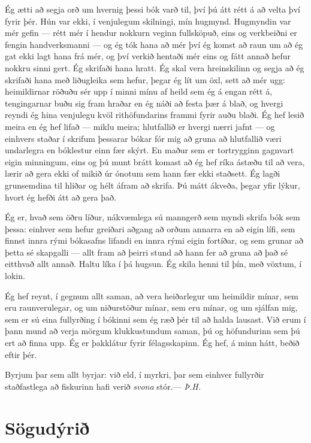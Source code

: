 Ég ætti að segja orð um hvernig þessi bók varð til, því þú átt rétt á að velta því fyrir þér. Hún var ekki, í venjulegum skilningi, mín hugmynd. Hugmyndin var mér gefin — rétt mér í hendur nokkurn veginn fullsköpuð, eins og verkbeiðni er fengin handverksmanni — og ég tók hana að mér því ég komst að raun um að ég gat ekki lagt hana frá mér, og því verkið hentaði mér eins og fátt annað hefur nokkru sinni gert. Ég skrifaði hana hratt. Ég skal vera hreinskilinn og segja að ég skrifaði hana með liðugleika sem hefur, þegar ég lít um öxl, sett að mér ugg: heimildirnar röðuðu sér upp í minni mínu af heild sem ég á engan rétt á, tengingarnar buðu sig fram hraðar en ég náði að festa þær á blað, og hvergi reyndi ég hina venjulegu kvöl rithöfundarins frammi fyrir auðu blaði. Ég hef lesið meira en ég hef lifað — miklu meira; hlutfallið er hvergi nærri jafnt — og einhvers staðar í skrifum þessarar bókar fór mig að gruna að hlutfallið væri undarlegra en bóklestur einn fær skýrt. En maður sem er tortrygginn gagnvart eigin minningum, eins og þú munt brátt komast að ég hef ríka ástæðu til að vera, lærir að gera ekki of mikið úr ónotum sem hann fær ekki staðsett. Ég lagði grunsemdina til hliðar og hélt áfram að skrifa. Þú mátt ákveða, þegar yfir lýkur, hvort ég hefði átt að gera það.

Ég er, hvað sem öðru líður, nákvæmlega sú manngerð sem myndi skrifa bók sem þessa: einhver sem hefur greiðari aðgang að orðum annarra en að eigin lífi, sem finnst innra rými bókasafns lifandi en innra rými eigin fortíðar, og sem grunar að þetta sé skapgalli — allt fram að þeirri stund að hann fer að gruna að það sé eitthvað allt annað. Haltu líka í þá hugsun. Ég skila henni til þín, með vöxtum, í lokin.

Ég hef reynt, í gegnum allt saman, að vera heiðarlegur um heimildir mínar, sem eru raunverulegar, og um niðurstöður mínar, sem eru mínar, og um sjálfan mig, sem er sú eina fullyrðing í bókinni sem ég ræð þér til að halda lausast. Við erum í þann mund að verja mörgum klukkustundum saman, þú og höfundurinn sem þú ert að finna upp. Ég er þakklátur fyrir félagsskapinn. Ég hef, á minn hátt, beðið eftir þér.

Byrjum þar sem allt byrjar: við eld, í myrkri, þar sem einhver fullyrðir staðfastlega að fiskurinn hafi verið \emph{svona} stór.\hfill— \emph{Þ.H.}

\newpage
\renewcommand\contentsname{Efnisyfirlit}
\tableofcontents*

\chapter{Sögudýrið}

